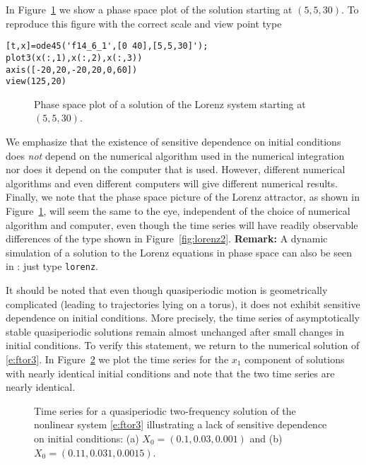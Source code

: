\documentclass{ximera}
\begin{document}
In Figure~\ref{fig:lorenz3} we show a phase space plot of the
solution starting at $(5,5,30)$.  To reproduce this figure with the 
correct scale and view point type
\begin{verbatim}
[t,x]=ode45('f14_6_1',[0 40],[5,5,30]');
plot3(x(:,1),x(:,2),x(:,3))
axis([-20,20,-20,20,0,60])
view(125,20)
\end{verbatim}
\begin{figure}[htb]
   \centerline{%
   }
   \caption{Phase space plot of a solution of the Lorenz system
   starting at $(5,5,30)$.}
   \label{fig:lorenz3}
\end{figure}

We emphasize that the existence of sensitive dependence on initial conditions 
does {\em not\/} depend on the numerical algorithm used in the numerical 
integration nor does it depend on the computer that is used.  However, 
different numerical algorithms and even different computers will give 
different numerical results.   Finally, we note that the phase space picture 
of the Lorenz attractor, as shown in 
Figure~\ref{fig:lorenz3}, will seem the same to the eye, independent of the 
choice of numerical algorithm and computer,
even though the time series will have readily observable differences of the
type shown in Figure~\ref{fig:lorenz2}.  {\bf Remark:}  A dynamic simulation 
of a solution to the Lorenz equations in phase space can also be seen in 
\Matlabp: just type {\tt lorenz}.

It should be noted that even though quasiperiodic motion is geometrically 
complicated (leading to trajectories lying on a torus), it does not exhibit
sensitive dependence on initial conditions.  More precisely, the time series 
of asymptotically stable quasiperiodic solutions remain almost unchanged 
after small changes in initial conditions.  To verify this statement, we 
return to the numerical solution of \eqref{e:ftor3}.  In Figure~\ref{F:tor3tsab}
we plot the time series for the $x_1$ component of solutions with nearly 
identical initial conditions and note that the two time series are nearly 
identical.

\begin{figure}[htb]
   \centerline{%
   }
   \caption{Time series for a quasiperiodic two-frequency solution of the 
	nonlinear system \protect\eqref{e:ftor3} illustrating a lack of sensitive 
	dependence on initial conditions: (a) $X_0=(0.1,0.03,0.001)$ and (b) 
	$X_0=(0.11,0.031,0.0015)$.}
   \label{F:tor3tsab}
\end{figure}
\end{document}
